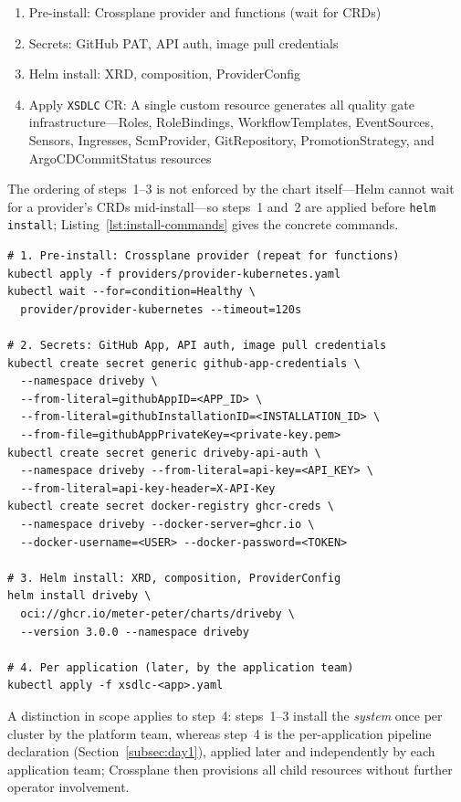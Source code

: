 \begin{enumerate}
    \item Pre-install: Crossplane provider and functions (wait for CRDs)
    \item Secrets: GitHub PAT, API auth, image pull credentials
    \item Helm install: XRD, composition, ProviderConfig
    \item Apply \texttt{XSDLC} CR: A single custom resource generates all quality gate infrastructure---Roles, RoleBindings, WorkflowTemplates, EventSources, Sensors, Ingresses, ScmProvider, GitRepository, PromotionStrategy, and ArgoCDCommitStatus resources
\end{enumerate}

The ordering of steps~1--3 is not enforced by the chart itself---Helm cannot wait for a provider's CRDs mid-install---so steps~1 and~2 are applied before \texttt{helm install}; Listing~\ref{lst:install-commands} gives the concrete commands.

\begin{lstlisting}[caption={Installation commands per phase.},label={lst:install-commands},basicstyle=\ttfamily\footnotesize]
# 1. Pre-install: Crossplane provider (repeat for functions)
kubectl apply -f providers/provider-kubernetes.yaml
kubectl wait --for=condition=Healthy \
  provider/provider-kubernetes --timeout=120s

# 2. Secrets: GitHub App, API auth, image pull credentials
kubectl create secret generic github-app-credentials \
  --namespace driveby \
  --from-literal=githubAppID=<APP_ID> \
  --from-literal=githubInstallationID=<INSTALLATION_ID> \
  --from-file=githubAppPrivateKey=<private-key.pem>
kubectl create secret generic driveby-api-auth \
  --namespace driveby --from-literal=api-key=<API_KEY> \
  --from-literal=api-key-header=X-API-Key
kubectl create secret docker-registry ghcr-creds \
  --namespace driveby --docker-server=ghcr.io \
  --docker-username=<USER> --docker-password=<TOKEN>

# 3. Helm install: XRD, composition, ProviderConfig
helm install driveby \
  oci://ghcr.io/meter-peter/charts/driveby \
  --version 3.0.0 --namespace driveby

# 4. Per application (later, by the application team)
kubectl apply -f xsdlc-<app>.yaml
\end{lstlisting}

A distinction in scope applies to step~4: steps~1--3 install the \textit{system} once per cluster by the platform team, whereas step~4 is the per-application pipeline declaration (Section~\ref{subsec:day1}), applied later and independently by each application team; Crossplane then provisions all child resources without further operator involvement.

